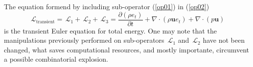 \documentclass[10pt]{article}
\newcommand{\bv}[1]{\ensuremath{\mbox{\boldmath$ #1 $}}}
\newcommand{\Diff}[2] {\dfrac{\partial( #1)}{\partial #2}}
\newcommand{\Lo}{\,\mathcal{L}}
\begin{document}
The equation formend  by including sub-operator (\ref{op01}) in (\ref{op02})
$$\Lo_{\text{transient}}=\Lo_1+\Lo_2+\Lo_3=\Diff{\rho e_t}{t}+\nabla \cdot (\rho\mathbf{u}e_t)+ \nabla\cdot(p  \mathbf{u})$$
is the transient Euler equation for total energy. One may note that the manipulations previously performed on sub-operators $\Lo_1$ and $\Lo_2$ have not been changed, what saves computational resources, and mostly importante, circumvent a possible combinatorial explosion.



% 


\end{document}
